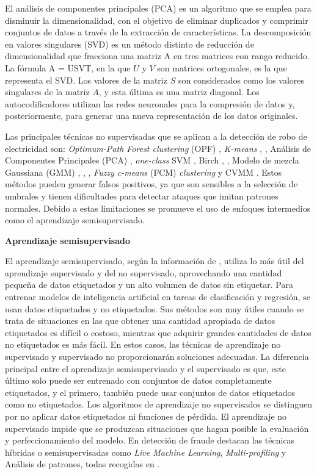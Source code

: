 \documentclass[12pt,a4paper]{report}
\begin{document}
El análisis de componentes principales (PCA) es un algoritmo que se emplea para disminuir la dimensionalidad, con el objetivo de eliminar duplicados y comprimir conjuntos de datos a través de la extracción de características. La descomposición en valores singulares (SVD) es un método distinto de reducción de dimensionalidad que fracciona una matriz A en tres matrices con rango reducido. La fórmula A = USVT, en la que $U$ y $V$ son matrices ortogonales, es la que representa el SVD. Los valores de la matriz $S$ son considerados como los valores singulares de la matriz $A$, y esta última es una matriz diagonal. Los autocodificadores utilizan las redes neuronales para la compresión de datos y, posteriormente, para generar una nueva representación de los datos originales.

Las principales técnicas no supervisadas que se aplican a la detección de robo de electricidad son: \emph{Optimum-Path Forest clustering} (OPF) \cite{articuloBase}, \emph{K-means} \cite{articuloBase}, \cite{articulo8}, Análisis de Componentes Principales (PCA) \cite{articuloBase}, \emph{one-class} SVM \cite{articuloBase}, Birch \cite{articuloBase}, \cite{articulo8}, Modelo de mezcla Gaussiana (GMM) \cite{articuloBase}, \cite{articulo7}, \cite{articulo10}, \emph{Fuzzy c-means} (FCM) \emph{clustering} \cite{articulo9} y CVMM \cite{articulo10}. Estos métodos pueden generar falsos positivos, ya que son sensibles a la selección de umbrales y tienen dificultades para detectar ataques que imitan patrones normales. Debido a estas limitaciones se promueve el uso de enfoques intermedios como el aprendizaje semisupervisado.

\medskip

\textbf{Aprendizaje semisupervisado}

El aprendizaje semisupervisado, según la información de \cite{ML Semisupervisado}, utiliza lo más útil del aprendizaje supervisado y del no supervisado, aprovechando una cantidad pequeña de datos etiquetados y un alto volumen de datos sin etiquetar. Para entrenar modelos de inteligencia artificial en tareas de clasificación y regresión, se usan datos etiquetados y no etiquetados. Sus métodos son muy útiles cuando se trata de situaciones en las que obtener una cantidad apropiada de datos etiquetados es difícil o costoso, mientras que adquirir grandes cantidades de datos no etiquetados es más fácil. En estos casos, las técnicas de aprendizaje no supervisado y supervisado no proporcionarán soluciones adecuadas. La diferencia principal entre el aprendizaje semisupervisado y el supervisado es que, este último solo puede ser entrenado con conjuntos de datos completamente etiquetados, y el primero, también puede usar conjuntos de datos etiquetados como no etiquetados. Los algoritmos de aprendizaje no supervisados se distinguen por no aplicar datos etiquetados ni funciones de pérdida. El aprendizaje no supervisado impide que se produzcan situaciones que hagan posible la evaluación y perfeccionamiento del modelo. En detección de fraude destacan las técnicas híbridas o semisupervisadas como \emph{Live Machine Learning}, \emph{Multi-profiling} y Análisis de patrones, todas recogidas en \cite{articulo5}.
\end{document}
